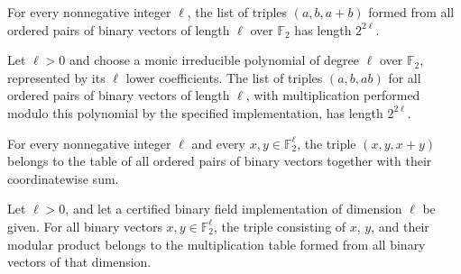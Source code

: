 \begin{theorem}
\label{FABL.length_binaryAdditionTable}
\leanok
{}
For every nonnegative integer $\ell$, the list of triples $(a,b,a+b)$ formed from all
ordered pairs of binary vectors of length $\ell$ over $\mathbb F_2$ has length
$2^{2\ell}$.
\end{theorem}

\begin{theorem}
\label{FABL.length_binaryMultiplicationTable}
\leanok
{}
Let $\ell>0$ and choose a monic irreducible polynomial of degree $\ell$ over $\mathbb
F_2$, represented by its $\ell$ lower coefficients. The list of triples $(a,b,ab)$ for
all ordered pairs of binary vectors of length $\ell$, with multiplication performed
modulo this polynomial by the specified implementation, has length $2^{2\ell}$.
\end{theorem}

\begin{theorem}
\label{FABL.mem_binaryAdditionTable}
\leanok
{}
For every nonnegative integer $\ell$ and every $x,y\in\mathbb F_2^\ell$, the triple
$(x,y,x+y)$ belongs to the table of all ordered pairs of binary vectors together with
their coordinatewise sum.
\end{theorem}

\begin{theorem}
\label{FABL.mem_binaryMultiplicationTable}
\leanok
{}
Let $\ell>0$, and let a certified binary field implementation of dimension $\ell$ be
given. For all binary vectors $x,y\in\mathbb{F}_2^\ell$, the triple consisting of $x$,
$y$, and their modular product belongs to the multiplication table formed from all
binary vectors of that dimension.
\end{theorem}

